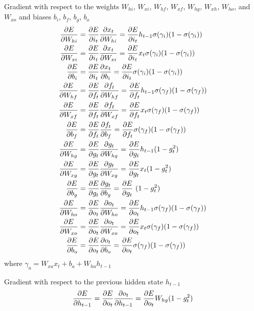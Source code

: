 Gradient with respect to the weights $W_{hi}$, $W_{xi}$, $W_{hf}$, $W_{xf}$, $W_{hg}$, $W_{xh}$, $W_{ho}$, and $W_{xo}$ and biases $b_{i}$,  $b_{f}$, $b_{g}$, $b_{o}$
\newcommand{\pdvsigmoid}[1]{\sigma(#1)(1-\sigma(#1))}
\newcommand{\pdvtanh}[1]{\sech^2(#1)}
\renewcommand{\pdvEit}{\pdv{E}{i_t}}
\renewcommand{\pdvEft}{\pdv{E}{f_t}}
\renewcommand{\pdvEgt}{\pdv{E}{g_t}}
\renewcommand{\pdvEot}{\pdv{E}{o_t}}
\begin{align}
    \begin{split}
        \pdv{E}{W_{hi}} &= \pdv{E}{i_t}\pdv{x_t}{W_{hi}} =  \pdvEit h_{t-1} \pdvsigmoid{\gamma_i}\\
        \pdv{E}{W_{xi}} &= \pdv{E}{i_t}\pdv{x_t}{W_{xi}} =  \pdvEit x_t \pdvsigmoid{\gamma_i}\\
        \pdv{E}{b_{i}} &= \pdv{E}{i_t}\pdv{x_t}{b_{i}} =  \pdvEit \pdvsigmoid{\gamma_i}\\
        \pdv{E}{W_{hf}} &= \pdv{E}{f_t}\pdv{f_t}{W_{hf}} = \pdvEft h_{t-1} \pdvsigmoid{\gamma_f}\\
        \pdv{E}{W_{xf}} &= \pdv{E}{f_t}\pdv{f_t}{W_{xf}} = \pdvEft x_t \pdvsigmoid{\gamma_f}\\
        \pdv{E}{b_{f}} &= \pdv{E}{f_t}\pdv{f_t}{b_{f}} = \pdvEft \pdvsigmoid{\gamma_f}\\
        \pdv{E}{W_{hg}} &= \pdv{E}{g_t}\pdv{g_t}{W_{hg}} = \pdvEgt h_{t-1} (1-g_t^2)  \\
        \pdv{E}{W_{xg}} &= \pdv{E}{g_t}\pdv{g_t}{W_{xg}} = \pdvEgt x_t(1-g_t^2)\\
        \pdv{E}{b_{g}} &= \pdv{E}{g_t}\pdv{g_t}{b_{g}} = \pdvEgt ~ (1-g_t^2)\\
        \pdv{E}{W_{ho}} &= \pdv{E}{o_t}\pdv{o_t}{W_{ho}} = \pdvEot h_{t-1} \pdvsigmoid{\gamma_f}\\
        \pdv{E}{W_{xo}} &= \pdv{E}{o_t}\pdv{o_t}{W_{xo}} = \pdvEot x_t \pdvsigmoid{\gamma_f}\\
        \pdv{E}{b_{o}} &= \pdv{E}{o_t}\pdv{o_t}{b_{o}} = \pdvEot \pdvsigmoid{\gamma_f}\\
    \end{split}
\end{align}
where $\gamma_a = W_{xa}x_t + b_{a} + W_{ha}h_{t-1}$

Gradient with respect to the previous hidden state $h_{t-1}$
\begin{equation}
    \pdv{E}{h_{t-1}} = \pdv{E}{o_t} \pdv{o_t}{h_{t-1}} = \pdvEot W_{hg} (1-g_t^2)
\end{equation}

